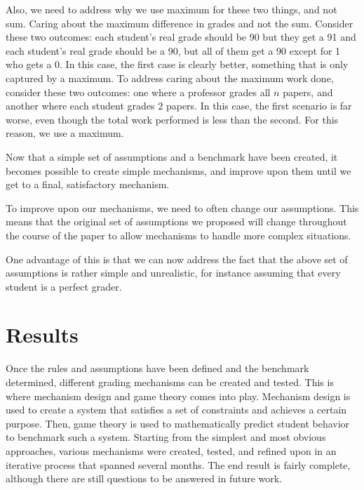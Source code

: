 \documentclass[12pt, Arial]{article}
\begin{document}
Also, we need to address why we use maximum for these two things, and not sum. Caring about the maximum difference in grades and not the sum. Consider these two outcomes: each student's real grade should be 90 but they get a 91 and each student's real grade should be a 90, but all of them get a 90 except for 1 who gets a 0. In this case, the first case is clearly better, something that is only captured by a maximum. To address caring about the maximum work done, consider these two outcomes: one where a professor grades all $n$ papers, and another where each student grades $2$ papers. In this case, the first scenario is far worse, even though the total work performed is less than the second. For this reason, we use a maximum.




Now that a simple set of assumptions and a benchmark have been created, it becomes possible to create simple mechanisms, and improve upon them until we get to a final, satisfactory mechanism.

To improve upon our mechanisms, we need to often change our assumptions. This means that the original set of assumptions we proposed will change throughout the course of the paper to allow mechanisms to handle more complex situations.

One advantage of this is that we can now address the fact that the above set of assumptions is rather simple and unrealistic, for instance assuming that every student is a perfect grader.
\section{Results}
Once the rules and assumptions have been defined and the benchmark determined, different grading mechanisms can be created and tested. This is where mechanism design and game theory comes into play. Mechanism design is used to create a system that satisfies a set of constraints and achieves a certain purpose. Then, game theory is used to mathematically predict student behavior to benchmark such a system. Starting from the simplest and most obvious approaches, various mechanisms were created, tested, and refined upon in an iterative process that spanned several months. The end result is fairly complete, although there are still questions to be answered in future work.
\end{document}
